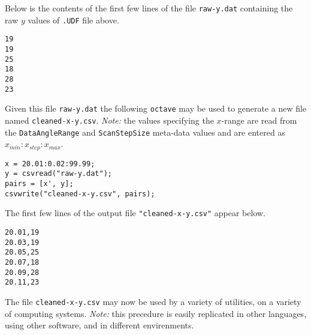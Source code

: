 \documentclass[10pt, a4paper, oneside]{article}
\begin{document}
\par{Below is the contents of the first few lines of the file \lstinline{raw-y.dat} containing the raw $y$ values of \lstinline{.UDF} file above.}

\begin{lstlisting}
19
19
25
18
28
23
\end{lstlisting}

\par{Given this file \lstinline{raw-y.dat} the following \lstinline{octave} may be used to generate a new file named \lstinline{cleaned-x-y.csv}. \emph{Note:} the values specifying the $x$-range are read from the \lstinline{DataAngleRange} and \lstinline{ScanStepSize} meta-data values and are entered as $x_{min}:x_{step}:x_{max}$.}

\begin{lstlisting}
x = 20.01:0.02:99.99;
y = csvread("raw-y.dat");
pairs = [x', y];
csvwrite("cleaned-x-y.csv", pairs);
\end{lstlisting}

\par{The first few lines of the output file \lstinline{"cleaned-x-y.csv"} appear below.}
\begin{lstlisting}
20.01,19
20.03,19
20.05,25
20.07,18
20.09,28
20.11,23
\end{lstlisting}

\par{The file \lstinline{cleaned-x-y.csv} may now be used by a variety of utilities, on a variety of computing systems. \emph{Note:} this precedure is easily replicated in other languages, using other software, and in different envirenments.}
\end{document}
